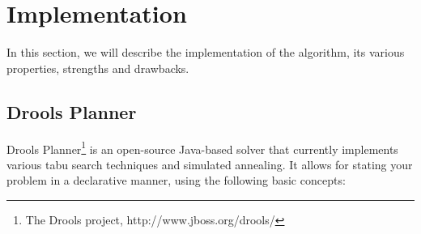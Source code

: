 \documentclass[10pt,a4paper,final]{article}
\begin{document}
\section{Implementation}

In this section, we will describe the implementation of the algorithm, its various properties, strengths and drawbacks.

\subsection{Drools Planner} 

Drools Planner\footnote{The Drools project, http://www.jboss.org/drools/} is an open-source Java-based solver that currently implements various tabu search techniques and simulated annealing. It allows for stating your problem in a declarative manner, using the following basic concepts:
\end{document}
